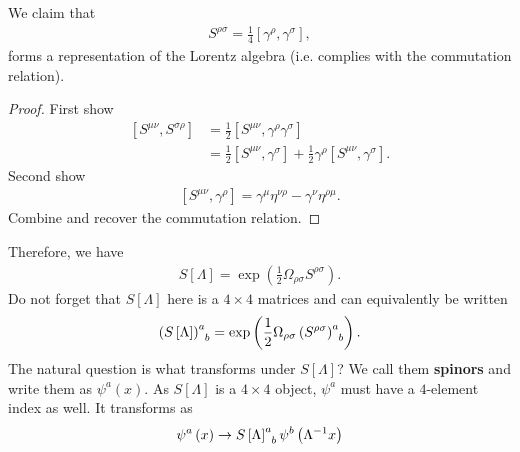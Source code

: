 \begin{examples}
\begin{enumerate}[label=\arabic*)]
            \begin{claim}
                We claim that
                \begin{align}
                    S^{\rho \sigma} = \frac{1}{4} \left[ \gamma^{\rho}, \gamma^{\sigma} \right] 
                ,\end{align}
                forms a representation of the Lorentz algebra (i.e. complies with the commutation relation).
            \end{claim}
            \begin{proof}
                First show
                \begin{align}
                    \left[ S^{\mu \nu}, S^{\sigma \rho} \right] &= \frac{1}{2} \left[ S^{\mu \nu}, \gamma^{\rho} \gamma^{\sigma} \right]   \\
                    &= \frac{1}{2} \left[ S^{\mu \nu}, \gamma^{\sigma} \right] + \frac{1}{2} \gamma^{\rho} \left[ S^{\mu \nu}, \gamma^{\sigma} \right] 
                .\end{align}
                Second show
                \begin{align}
                    \left[ S^{\mu \nu}, \gamma^{\rho} \right] = \gamma^{\mu} \eta^{\nu \rho} - \gamma^{\nu} \eta^{\rho \mu}
                .\end{align}
                Combine and recover the commutation relation.
            \end{proof}
            Therefore, we have
            \begin{align}
                S\left[ \Lambda \right] = \exp \left( \frac{1}{2} \Omega_{\rho \sigma} S^{\rho \sigma} \right) 
            .\end{align}
            Do not forget that $S \left[ \Lambda \right] $ here is a $4 \times 4$ matrices and can equivalently be written
            \begin{align}
               \tensor{\left( S\left[ \Lambda \right] \right) }{^{a}_b}  = \exp \left( \frac{1}{2} \Omega_{\rho \sigma} \tensor{\left( S^{\rho \sigma} \right) }{^{a}_b} \right) 
            .\end{align}
            The natural question is what transforms under $S \left[ \Lambda \right] $? We call them \textbf{spinors} and write them as $\psi^{a}\left( x \right) $. As $S \left[ \Lambda \right] $ is a $4 \times 4$ object, $\psi^{a}$ must have a $4$-element index as well. It transforms as
            \begin{align}
                \psi^{a}\left( x \right) \to \tensor{S\left[ \Lambda \right] }{^{a}_b} \psi^{b}\left( \Lambda^{-1} x \right) 

\end{align}
\end{enumerate}
\end{examples}
